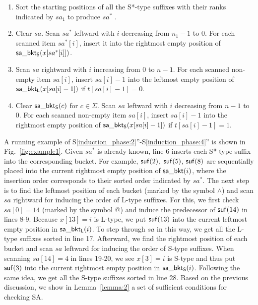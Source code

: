 \documentclass[10pt,journal,compsoc]{IEEEtran}
\begin{document}
\begin{enumerate}[S1'']
	\item Sort the starting positions of all the S*-type suffixes with their ranks indicated by $sa_1$ to produce $sa^*$ \label{induction_phase:1}.

	\item Clear $sa$. Scan $sa^*$ leftward with $i$ decreasing from $n_1 - 1$ to $0$. For each scanned item $sa^*[i]$, insert it into the rightmost empty position of ${\sf sa\_bkt_S}(x[sa^*[i]])$. \label{induction_phase:2}
	
	\item Scan $sa$ rightward with $i$ increasing from $0$ to $n - 1$. For each scanned non-empty item $sa[i]$, insert $sa[i] - 1$ into the leftmost empty position of ${\sf sa\_bkt_L}(x[sa[i] - 1])$ if $t[sa[i] - 1] = 0$.\label{induction_phase:3}
	
	\item Clear ${\sf sa\_bkt_S}(c)$ for $c \in \Sigma$. Scan $sa$ leftward with $i$ decreasing from $n - 1$ to $0$. For each scanned non-empty item $sa[i]$, insert $sa[i] - 1$ into the rightmost empty position of ${\sf sa\_bkt_S}(x[sa[i] - 1])$ if $t[sa[i] - 1] = 1$.\label{induction_phase:4}
	
\end{enumerate}

A running example of S\ref{induction_phase:2}''-S\ref{induction_phase:4}'' is shown in Fig.~\ref{fig:example1}. Given $sa^*$ is already known, line 6 inserts each S*-type suffix into the corresponding bucket. For example, ${\sf suf}(2)$, ${\sf suf}(5)$, ${\sf suf}(8)$ are sequentially placed into the current rightmost empty position of ${\sf sa\_bkt}(i)$, where the insertion order corresponds to their sorted order indicated by $sa^*$. The next step is to find the leftmost position of each bucket (marked by the symbol $\wedge$) and scan $sa$ rightward for inducing the order of L-type suffixes. For this, we first check $sa[0] = 14$ (marked by the symbol @) and induce the predecessor of ${\sf suf}(14)$ in lines 8-9. Because $x[13] = i$ is L-type, we put ${\sf suf}(13)$ into the current leftmost empty position in ${\sf sa\_bkt_L}(i)$. To step through $sa$ in this way, we get all the L-type suffixes sorted in line 17. Afterward, we find the rightmost position of each bucket and scan $sa$ leftward for inducing the order of S-type suffixes. When scanning $sa[14] = 4$ in lines 19-20, we see $x[3] = i$ is S-type and thus put ${\sf suf}(3)$ into the current rightmost empty position in ${\sf sa\_bkt_S}(i)$. Following the same idea, we get all the S-type suffixes sorted in line 28. Based on the previous discussion, we show in Lemma~\ref{lemma:2} a set of sufficient conditions for checking SA.
\end{document}
